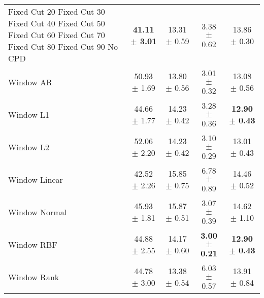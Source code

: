\begin{table}[!htpb]
\begin{tabular}{lcccc}
Fixed Cut 20%
Fixed Cut 30%
Fixed Cut 40%
Fixed Cut 50%
Fixed Cut 60%
Fixed Cut 70%
Fixed Cut 80%
Fixed Cut 90%
No CPD & \textbf{41.11 $\pm$ 3.01} & 13.31 $\pm$ 0.59 & 3.38 $\pm$ 0.62 & 13.86 $\pm$ 0.30 \\
Window AR & 50.93 $\pm$ 1.69 & 13.80 $\pm$ 0.56 & 3.01 $\pm$ 0.32 & 13.08 $\pm$ 0.56 \\
Window L1 & 44.66 $\pm$ 1.77 & 14.23 $\pm$ 0.42 & 3.28 $\pm$ 0.36 & \textbf{12.90 $\pm$ 0.43} \\
Window L2 & 52.06 $\pm$ 2.20 & 14.23 $\pm$ 0.42 & 3.10 $\pm$ 0.29 & 13.01 $\pm$ 0.43 \\
Window Linear & 42.52 $\pm$ 2.26 & 15.85 $\pm$ 0.75 & 6.78 $\pm$ 0.89 & 14.46 $\pm$ 0.52 \\
Window Normal & 45.93 $\pm$ 1.81 & 15.87 $\pm$ 0.51 & 3.07 $\pm$ 0.39 & 14.62 $\pm$ 1.10 \\
Window RBF & 44.88 $\pm$ 2.55 & 14.17 $\pm$ 0.60 & \textbf{3.00 $\pm$ 0.21} & \textbf{12.90 $\pm$ 0.43} \\
Window Rank & 44.78 $\pm$ 3.00 & 13.38 $\pm$ 0.54 & 6.03 $\pm$ 0.57 & 13.91 $\pm$ 0.84 \\
        \bottomrule
    \end{tabular}
    \label{tab:rmse_results}
\end{table}
